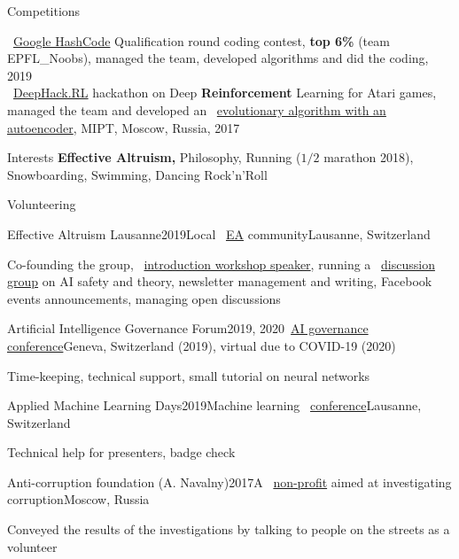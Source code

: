 \documentclass{resume} %
\newcommand{\mylink}{{\color{gray}\faExternalLink}}
\begin{document}
\begin{rSection}{Competitions}
\vspace{-1em}
\item \mylink~\href{https://hashcodejudge.withgoogle.com/scoreboard}{Google HashCode} Qualification round coding contest, {\bf top 6\%} (team EPFL\_Noobs), managed the team, developed algorithms and did the coding, 2019\vspace{1em}\\
\mylink~\href{http://web.archive.org/web/20170224094223/http://rl.deephack.me/}{DeepHack.RL} hackathon on Deep {\bf Reinforcement} Learning for Atari games, managed the team and developed an \mylink~\href{https://github.com/sergeivolodin/deephack.rl}{evolutionary algorithm with an autoencoder}, MIPT, Moscow, Russia, 2017
\end{rSection}

\begin{rSection}{Interests}
	{\bf Effective Altruism,} Philosophy, Running ($1/2$ marathon 2018), Snowboarding, Swimming, Dancing Rock'n'Roll
\end{rSection}

\begin{rSection}{Volunteering}
\begin{rSubsection}{Effective Altruism Lausanne}{2019}{Local \mylink~\href{https://effectivealtruism.org}{EA} community}{Lausanne, Switzerland}
	\item[] Co-founding the group, \mylink~\href{http://eageneva.org/about#our-members}{introduction workshop speaker}, running a \mylink~\href{https://docs.google.com/document/d/1prejPACr08nUVztHRBc4nj4upKtDc9_EJOYi1alWuYM/edit?usp=sharing}{discussion group} on AI safety and theory, newsletter management and writing, Facebook events announcements, managing open discussions
\end{rSubsection}

\begin{rSubsection}{Artificial Intelligence Governance Forum}{2019, 2020}{\mylink~\href{https://ai-gf.com/}{AI governance conference}}{Geneva, Switzerland (2019), virtual due to COVID-19 (2020)}
	\item[] Time-keeping, technical support, small tutorial on neural networks
\end{rSubsection}

\begin{rSubsection}{Applied Machine Learning Days}{2019}{Machine learning \mylink~\href{https://www.appliedmldays.org/}{conference}}{Lausanne, Switzerland}
\item[]	Technical help for presenters, badge check
\end{rSubsection}
	\begin{rSubsection}{Anti-corruption foundation (A. Navalny)}{2017}{A \mylink~\href{https://en.wikipedia.org/wiki/Anti-Corruption_Foundation}{non-profit} aimed at investigating corruption}{Moscow, Russia}
\item[] Conveyed the results of the investigations by talking to people on the streets as a volunteer
	\end{rSubsection}
\end{rSection}
\end{document}
